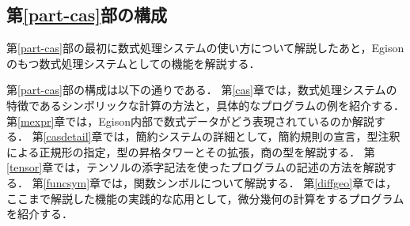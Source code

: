 
\subsection{第\ref{part-cas}部の構成}

第\ref{part-cas}部の最初に数式処理システムの使い方について解説したあと，Egisonのもつ数式処理システムとしての機能を解説する．

第\ref{part-cas}部の構成は以下の通りである．
第\ref{cas}章では，数式処理システムの特徴であるシンボリックな計算の方法と，具体的なプログラムの例を紹介する．
第\ref{mexpr}章では，Egison内部で数式データがどう表現されているのか解説する．
第\ref{casdetail}章では，簡約システムの詳細として，簡約規則の宣言，型注釈による正規形の指定，型の昇格タワーとその拡張，商の型を解説する．
第\ref{tensor}章では，テンソルの添字記法を使ったプログラムの記述の方法を解説する．
第\ref{funcsym}章では，関数シンボルについて解説する．
第\ref{diffgeo}章では，ここまで解説した機能の実践的な応用として，微分幾何の計算をするプログラムを紹介する．

